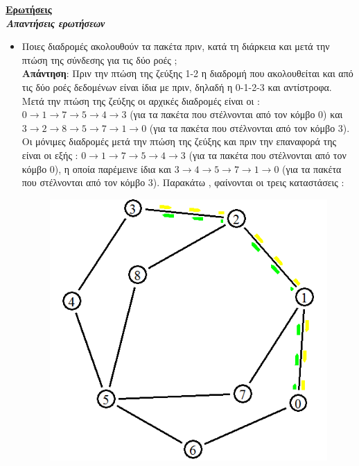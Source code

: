 \documentclass{article}%
\begin{document}
\newpage

\textbf{\underline{Ερωτήσεις}} \\
\textsl{\textbf{{Απαντήσεις ερωτήσεων}}}
\begin{itemize}
	\item Ποιες διαδρομές ακολουθούν τα πακέτα πριν, κατά τη διάρκεια και μετά την πτώση της
σύνδεσης για τις δύο ροές $;$ \\
\textbf{Απάντηση}: Πριν την πτώση της ζεύξης 1-2 η διαδρομή που ακολουθείται και από τις δύο ροές δεδομένων είναι ίδια με πριν, δηλαδή η 0-1-2-3 και αντίστροφα. Μετά την πτώση της ζεύξης οι αρχικές διαδρομές είναι οι : $0\rightarrow1\rightarrow 7\rightarrow 5\rightarrow 4\rightarrow 3$ (για τα πακέτα που στέλνονται από τον κόμβο 0) και $ 3\rightarrow 2\rightarrow 8\rightarrow 5\rightarrow 7\rightarrow 1\rightarrow 0$ (για τα πακέτα που στέλνονται από τον κόμβο 3). Οι μόνιμες διαδρομές μετά την πτώση της ζεύξης και πριν την επαναφορά της είναι οι εξής : $0\rightarrow1\rightarrow 7\rightarrow 5\rightarrow 4\rightarrow 3$ (για τα πακέτα που στέλνονται από τον κόμβο 0), η οποία παρέμεινε ίδια και $3\rightarrow 4\rightarrow 5\rightarrow 7\rightarrow 1\rightarrow 0$ (για τα πακέτα που στέλνονται από τον κόμβο 3). Παρακάτω , φαίνονται οι τρεις καταστάσεις :
\begin{figure}[htbp]
\centering
\begin{minipage}{0.36\textwidth}
\centering
\includegraphics[width=1.00\textwidth]{6.png}

\end{minipage}
\end{figure}
\end{itemize}
\end{document}
